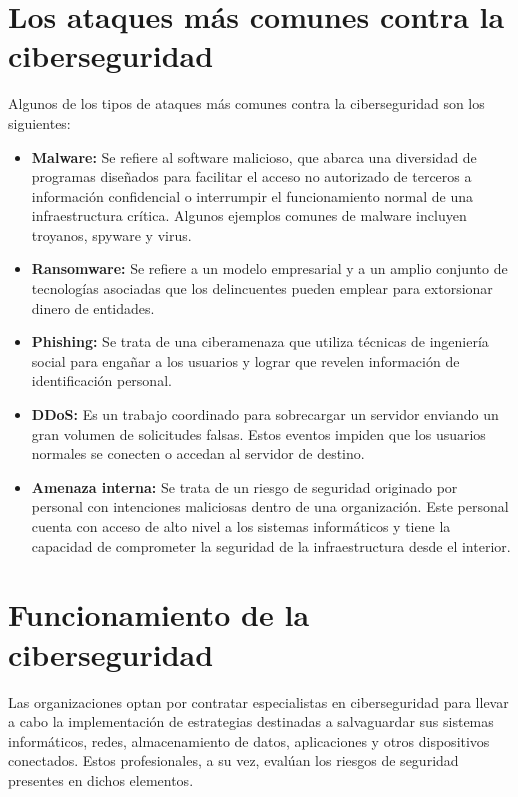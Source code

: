 \documentclass[11pt]{report}
\begin{document}
\section{Los ataques más comunes contra la ciberseguridad}
Algunos de los tipos de ataques más comunes contra la ciberseguridad son los siguientes:
\begin{itemize}
  \item \textbf{Malware:} Se refiere al software malicioso, que abarca una diversidad de programas diseñados para facilitar el acceso no autorizado de terceros a información confidencial o interrumpir el funcionamiento normal de una infraestructura crítica. Algunos ejemplos comunes de malware incluyen troyanos, spyware y virus.

  \item \textbf{Ransomware:} Se refiere a un modelo empresarial y a un amplio conjunto de tecnologías asociadas que los delincuentes pueden emplear para extorsionar dinero de entidades.
  
  \cleardoublepage

  \item \textbf{Phishing: } Se trata de una ciberamenaza que utiliza técnicas de ingeniería social para engañar a los usuarios y lograr que revelen información de identificación personal. 

  \item \textbf{DDoS: } Es un trabajo coordinado para sobrecargar un servidor enviando un gran volumen de solicitudes falsas. Estos eventos impiden que los usuarios normales se conecten o accedan al servidor de destino. 
  
  \item \textbf{Amenaza interna: } Se trata de un riesgo de seguridad originado por personal con intenciones maliciosas dentro de una organización. Este personal cuenta con acceso de alto nivel a los sistemas informáticos y tiene la capacidad de comprometer la seguridad de la infraestructura desde el interior.
\end{itemize}

\section{Funcionamiento de la ciberseguridad}
Las organizaciones optan por contratar especialistas en ciberseguridad para llevar a cabo la implementación de estrategias destinadas a salvaguardar sus sistemas informáticos, redes, almacenamiento de datos, aplicaciones y otros dispositivos conectados. Estos profesionales, a su vez, evalúan los riesgos de seguridad presentes en dichos elementos.
\end{document}

